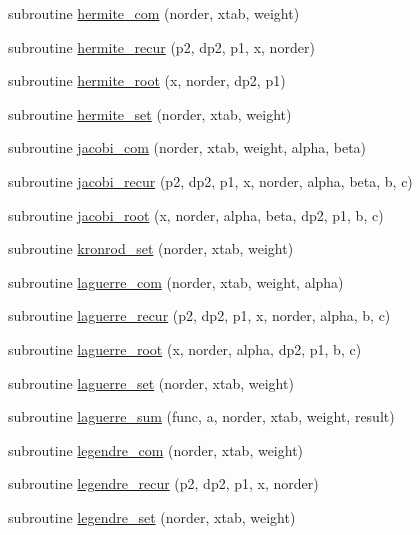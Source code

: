 \begin{DoxyCompactItemize}
\item 
subroutine \hyperlink{quadrule_8f90_a85e94b692189c91a3f77d8f4c210f70f}{hermite\_\-com} (norder, xtab, weight)
\item 
subroutine \hyperlink{quadrule_8f90_a837c192f4116548551a6c0b69465adbb}{hermite\_\-recur} (p2, dp2, p1, x, norder)
\item 
subroutine \hyperlink{quadrule_8f90_ae9c37528989dee8bb6c51ff8a4626c05}{hermite\_\-root} (x, norder, dp2, p1)
\item 
subroutine \hyperlink{quadrule_8f90_aef932141d0758eb99a63c743dbb0e893}{hermite\_\-set} (norder, xtab, weight)
\item 
subroutine \hyperlink{quadrule_8f90_a85d3b6982259e08e48b68f923ebaf48a}{jacobi\_\-com} (norder, xtab, weight, alpha, beta)
\item 
subroutine \hyperlink{quadrule_8f90_a23d5d91dbc68f334297c326bf251545b}{jacobi\_\-recur} (p2, dp2, p1, x, norder, alpha, beta, b, c)
\item 
subroutine \hyperlink{quadrule_8f90_a37ab0713ac179df20db1cbade4750d7c}{jacobi\_\-root} (x, norder, alpha, beta, dp2, p1, b, c)
\item 
subroutine \hyperlink{quadrule_8f90_a0fea29cd1cc25389b93d13d5680c4cc1}{kronrod\_\-set} (norder, xtab, weight)
\item 
subroutine \hyperlink{quadrule_8f90_a5e526b2dfca36cb4303a7ac532cc7e55}{laguerre\_\-com} (norder, xtab, weight, alpha)
\item 
subroutine \hyperlink{quadrule_8f90_a37a4edc203821495156eaa63b1c4d7fa}{laguerre\_\-recur} (p2, dp2, p1, x, norder, alpha, b, c)
\item 
subroutine \hyperlink{quadrule_8f90_a50878552a6862bdc03e4e7d904d7b154}{laguerre\_\-root} (x, norder, alpha, dp2, p1, b, c)
\item 
subroutine \hyperlink{quadrule_8f90_a35fe6a5ac275303facfa7b695addee7f}{laguerre\_\-set} (norder, xtab, weight)
\item 
subroutine \hyperlink{quadrule_8f90_a5b2ffde45facf187cd2716ab11d0dbef}{laguerre\_\-sum} (func, a, norder, xtab, weight, result)
\item 
subroutine \hyperlink{quadrule_8f90_a0a7d1ce74b60aacdf3cab1fe515cb484}{legendre\_\-com} (norder, xtab, weight)
\item 
subroutine \hyperlink{quadrule_8f90_a0204938f840315c0ede180bd7ddf3d7a}{legendre\_\-recur} (p2, dp2, p1, x, norder)
\item 
subroutine \hyperlink{quadrule_8f90_a68e328951e712e3b7e2bc9f6dcf8fc6a}{legendre\_\-set} (norder, xtab, weight)

\end{DoxyCompactItemize}
